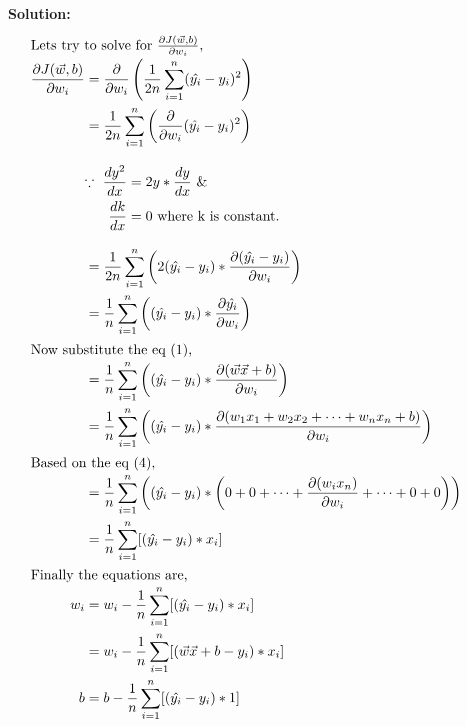 \documentclass[11pt]{article}
\begin{document}
\textbf{Solution:}
\begin{align}
    \intertext{Lets try to solve for $\frac{\partial{J(\vec{w}, b)}}{\partial{w_i}}$,}\notag\\[-7mm]
    \frac{\partial{J(\vec{w}, b)}}{\partial{w_i}} & = \frac{\partial}{\partial{w_i}}\left(\frac{1}{2n} \displaystyle\sum_{i=1}^{n} (\hat{y_i} - y_i)^2 \right) \notag\\
    & = \frac{1}{2n} \displaystyle\sum_{i=1}^{n} \left( \frac{\partial}{\partial{w_i}}(\hat{y_i} - y_i)^2 \right) \notag\\[3mm]
    & \begin{aligned}
        \because\ \frac{dy^2}{dx} &= 2y * \frac{dy}{dx} \text{ \&} \\
        \frac{dk}{dx} &= 0 \text{ where k is constant.}
    \end{aligned} \\[3mm]
    & = \frac{1}{2n} \displaystyle\sum_{i=1}^{n} \left(2(\hat{y_i} - y_i) * \frac{\partial{(\hat{y_i} - y_i)}}{\partial{w_i}} \right) \notag\\
    & = \frac{1}{n} \displaystyle\sum_{i=1}^{n} \left((\hat{y_i} - y_i) * \frac{\partial{\hat{y_i}}}{\partial{w_i}} \right) \notag\\
    \intertext{Now substitute the eq (1),}\notag\\[-7mm]
    & = \frac{1}{n} \displaystyle\sum_{i=1}^{n} \left((\hat{y_i} - y_i) * \frac{\partial{(\vec{w}\vec{x}+b)}}{\partial{w_i}} \right) \notag\\
    & = \frac{1}{n} \displaystyle\sum_{i=1}^{n} \left((\hat{y_i} - y_i) * \frac{\partial{(w_1 x_1+w_2 x_2+\dots+w_n x_n+b)}}{\partial{w_i}} \right) \notag\\
    \intertext{Based on the eq (4),}\notag\\[-7mm]
    & = \frac{1}{n} \displaystyle\sum_{i=1}^{n} \left((\hat{y_i} - y_i) * \left(0+0+\dots+\frac{\partial{(w_i x_n)}}{\partial{w_i}}+\dots+0+0\right) \right) \notag\\
    & = \frac{1}{n} \displaystyle\sum_{i=1}^{n} [(\hat{y_i} - y_i) * x_i ] \notag\\
    \intertext{Finally the equations are,}\notag\\[-7mm]
    w_i & = w_i - \frac{1}{n} \displaystyle\sum_{i=1}^{n} [(\hat{y_i} - y_i) * x_i ] \\
    & = w_i - \frac{1}{n} \displaystyle\sum_{i=1}^{n} [(\vec{w}\vec{x}+b - y_i) * x_i ] \notag\\
    b & = b - \frac{1}{n} \displaystyle\sum_{i=1}^{n} [(\hat{y_i} - y_i) * 1 ] \notag &&
\end{align}
\end{document}
